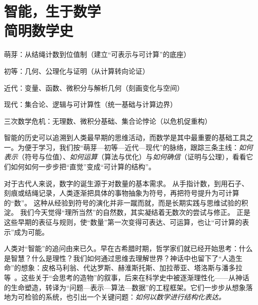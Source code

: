\chapter{智能，生于数学 \texorpdfstring{\\}{ }简明数学史}


\begin{introduction}
\item 萌芽：从结绳计数到位值制（建立“可表示与可计算”的底座）
\item 初等：几何、公理化与证明（从计算转向论证）
\item 近代：变量、函数、微积分与解析几何（刻画变化与空间）
\item 现代：集合论、逻辑与可计算性（统一基础与计算边界）
\item 三次数学危机：无理数、微积分基础、集合论悖论（以危机促重构）
\end{introduction}



智能的历史可以追溯到人类最早期的思维活动，而数学是其中最重要的基础工具之一。为便于学习，我们按“萌芽—初等—近代—现代”的脉络，跟踪三条主线：\emph{如何表示}（符号与位值）、\emph{如何运算}（算法与优化）与\emph{如何确信}（证明与公理），看看它们如何如何一步步把“直觉”变成“可计算的结构”。



对于古代人来说，数字的诞生源于对数量的基本需求。  
从手指计数，到用石子、刻痕或结绳记录，人类逐渐把具体的事物抽象为符号，再把符号提升为可计算的“数”。  
这种从经验到符号的演化并非一蹴而就，而是长期实践与思维试验的积淀。  
我们今天觉得“理所当然”的自然数，其实凝结着无数次的尝试与修正。
正是这些早期的表征与规则，使“数量”第一次变得可表达、可运算，也让“可计算的表示”成为可能。


人类对“智能”的追问由来已久。早在古希腊时期，哲学家们就已经开始思考：什么是智慧？什么是理性？我们如何通过思维去理解世界？神话中也留下了“人造生命”的想象：皮格马利翁、代达罗斯、赫淮斯托斯、加拉蒂亚、塔洛斯与潘多拉等~{\cite{OvidMartin2004,Sparkes1996,Tandy1997}}。这些关于“会思考的造物”的叙事，后来在科学史中被逐渐理性化——从神话的生命塑造，转译为“问题—表示—算法—数据”的工程框架。它们一步步从想象落地为可检验的系统，也引出一个关键问题：\emph{如何以数学进行结构化表达。}


